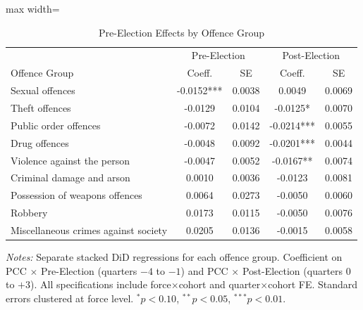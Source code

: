 \begin{table}[htbp]
\centering
\caption{Pre-Election Effects by Offence Group}
\label{tab:heterogeneity}
\begin{adjustbox}{max width=\textwidth}
\begin{tabular}{lcccc}
\hline\hline
 & \multicolumn{2}{c}{Pre-Election} & \multicolumn{2}{c}{Post-Election} \\
 Offence Group & Coeff. & SE & Coeff. & SE \\
\hline
Sexual offences & -0.0152*** & 0.0038 & 0.0049 & 0.0069 \\
Theft offences & -0.0129 & 0.0104 & -0.0125* & 0.0070 \\
Public order offences & -0.0072 & 0.0142 & -0.0214*** & 0.0055 \\
Drug offences & -0.0048 & 0.0092 & -0.0201*** & 0.0044 \\
Violence against the person & -0.0047 & 0.0052 & -0.0167** & 0.0074 \\
Criminal damage and arson & 0.0010 & 0.0036 & -0.0123 & 0.0081 \\
Possession of weapons offences & 0.0064 & 0.0273 & -0.0050 & 0.0060 \\
Robbery & 0.0173 & 0.0115 & -0.0050 & 0.0076 \\
Miscellaneous crimes against society & 0.0205 & 0.0136 & -0.0015 & 0.0058 \\
\hline\hline
\end{tabular}
\end{adjustbox}
\begin{tablenotes}[flushleft]
\item \textit{Notes:} Separate stacked DiD regressions for each offence group. Coefficient on PCC $\times$ Pre-Election (quarters $-4$ to $-1$) and PCC $\times$ Post-Election (quarters $0$ to $+3$). All specifications include force$\times$cohort and quarter$\times$cohort FE. Standard errors clustered at force level. $^{*}p<0.10$, $^{**}p<0.05$, $^{***}p<0.01$.
\end{tablenotes}
\end{table}

